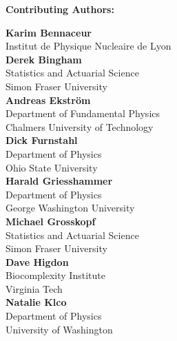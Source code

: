 {\bf \large Contributing Authors:}
\vspace{5mm}

\begin{minipage}[t]{0.5\linewidth}

\textbf{Karim Bennaceur}\\
Institut de Physique Nucleaire de Lyon\\

\textbf{Derek Bingham}\\
Statistics and Actuarial Science\\
Simon Fraser University\\

\textbf{Andreas Ekström}\\
Department of Fundamental Physics\\
Chalmers University of Technology\\

\textbf{Dick Furnstahl}\\
Department of Physics\\ 
Ohio State University\\

\textbf{Harald Griesshammer}\\
Department of Physics\\
George Washington University\\

\textbf{Michael Grosskopf}\\
Statistics and Actuarial Science\\
Simon Fraser University\\

\textbf{Dave Higdon}\\
Biocomplexity Institute\\
Virginia Tech\\

\textbf{Natalie Klco}\\
Department of Physics\\
University of Washington\\


\end{minipage}
\hfill
